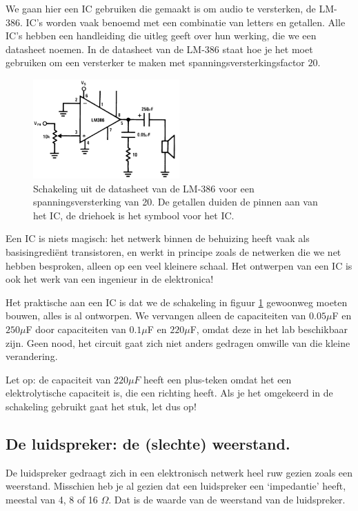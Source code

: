 \documentclass{article}
\begin{document}
			We gaan hier een IC gebruiken die gemaakt is om audio te versterken, de LM-386. IC's worden vaak benoemd met een combinatie van letters en getallen. Alle IC's hebben een handleiding die uitleg geeft over hun werking, die we een datasheet noemen. In de datasheet van de LM-386 staat hoe je het moet gebruiken om een versterker te maken met spanningsversterkingsfactor $20$.

			\begin{figure}[htbp]
				\centering
				\includegraphics[width=0.5\textwidth]{IC_versterker}
				\caption{Schakeling uit de datasheet van de LM-386 voor een spanningsversterking van 20. De getallen duiden de pinnen aan van het IC, de driehoek is het symbool voor het IC. }
				\label{fig:IC_versterker}
			\end{figure}

			Een IC is niets magisch: het netwerk binnen de behuizing heeft vaak als basisingredi\"ent transistoren, en werkt in principe zoals de netwerken die we net hebben besproken, alleen op een veel kleinere schaal. Het ontwerpen van een IC is ook het werk van een ingenieur in de elektronica!

			Het praktische aan een IC is dat we de schakeling in figuur \ref{fig:IC_versterker} gewoonweg moeten bouwen, alles is al ontworpen. We vervangen alleen de capaciteiten van $0.05 \mu$F en $250\mu$F door capaciteiten van $0.1\mu$F en $220\mu$F, omdat deze in het lab beschikbaar zijn. Geen nood, het circuit gaat zich niet anders gedragen omwille van die kleine verandering. 

			Let op: de capaciteit van $220\mu F$ heeft een plus-teken omdat het een elektrolytische capaciteit is, die een richting heeft. Als je het omgekeerd in de schakeling gebruikt gaat het stuk, let dus op!

		\subsection{De luidspreker: de (slechte) weerstand.} 
		
			De luidspreker gedraagt zich in een elektronisch netwerk heel ruw gezien zoals een weerstand. Misschien heb je al gezien dat een luidspreker een `impedantie' heeft, meestal van 4, 8 of 16 $\Omega$. Dat is de waarde van de weerstand van de luidspreker.
\end{document}
